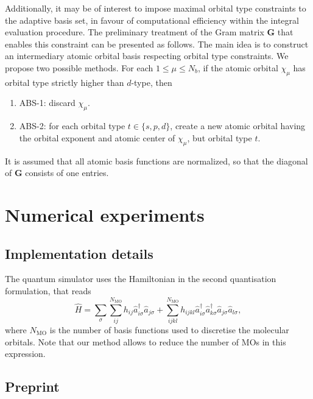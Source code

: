 \documentclass[a4paper,11pt]{article}
\DeclareMathOperator{\MO}{MO}
\begin{document}
Additionally, it may be of interest to impose maximal orbital type constraints
to the adaptive basis set, in favour of computational efficiency within the
integral evaluation procedure. The preliminary treatment of the Gram matrix $\bm G$ 
that enables this constraint can be presented as follows. The main idea is to
construct an intermediary atomic orbital basis respecting orbital type
constraints. We propose two possible
methods. For each $1\leq \mu\leq N_b$, if the atomic orbital $\chi_{\mu}$ has orbital 
type strictly higher than $d$-type, then
\begin{enumerate}[label=(\alph*)]
    \item ABS-1: discard $\chi_{\mu}$.
    \item ABS-2: for each orbital type $t\in\{s,p,d\}$, create a new atomic orbital
    having the orbital exponent and atomic center of $\chi_{\mu}$, but orbital
    type $t$.
\end{enumerate}
It is assumed that all atomic basis functions are normalized, so that the
diagonal of $\bm G$ consists of one entries.


\section{Numerical experiments}

\subsection{Implementation details}

The quantum simulator uses the Hamiltonian in the second quantisation
formulation, that reads
\begin{equation}
    \label{eq:H_sq}
    \hat H = \sum_{\sigma}\sum_{ij}^{N_{\MO}} h_{ij} \hat a^\dagger_{i\sigma} \hat
    a_{j\sigma} + \sum_{ijkl}^{N_{\MO}} h_{ijkl} \hat a^\dagger_{i\sigma} \hat
    a^\dagger_{k\sigma} \hat a_{j\sigma}\hat a_{l\sigma},
\end{equation}
where $N_{\MO}$ is the number of basis functions used to discretise the
molecular orbitals. Note that our method allows to reduce the number of MOs in this
expression.

\subsection{Preprint}
\end{document}
